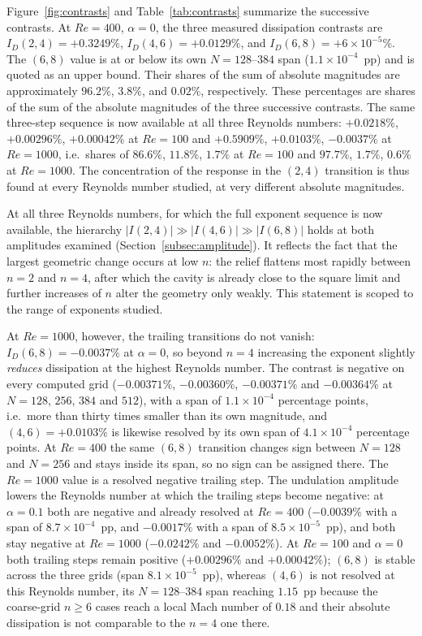 Figure~\ref{fig:contrasts} and Table~\ref{tab:contrasts} summarize the successive contrasts. At $Re=400$, $\alpha=0$, the three measured dissipation contrasts are $I_D(2,4)=+0.3249\%$, $I_D(4,6)=+0.0129\%$, and $I_D(6,8)=+6\times10^{-5}\%$. The $(6,8)$ value is at or below its own $N = 128$--$384$ span ($1.1\times10^{-4}$~pp) and is quoted as an upper bound. Their shares of the sum of absolute magnitudes are approximately $96.2\%$, $3.8\%$, and $0.02\%$, respectively. These percentages are shares of the sum of the absolute magnitudes of the three successive contrasts. The same three-step sequence is now available at all three Reynolds numbers: $+0.0218\%$, $+0.00296\%$, $+0.00042\%$ at $Re=100$ and $+0.5909\%$, $+0.0103\%$, $-0.0037\%$ at $Re=1000$, i.e.\ shares of $86.6\%$, $11.8\%$, $1.7\%$ at $Re=100$ and $97.7\%$, $1.7\%$, $0.6\%$ at $Re=1000$. The concentration of the response in the $(2,4)$ transition is thus found at every Reynolds number studied, at very different absolute magnitudes.

At all three Reynolds numbers, for which the full exponent sequence is now available, the hierarchy $|I(2,4)|\gg|I(4,6)|\gg|I(6,8)|$ holds at both amplitudes examined (Section~\ref{subsec:amplitude}). It reflects the fact that the largest geometric change occurs at low $n$: the relief flattens most rapidly between $n=2$ and $n=4$, after which the cavity is already close to the square limit and further increases of $n$ alter the geometry only weakly. This statement is scoped to the range of exponents studied.

At $Re=1000$, however, the trailing transitions do not vanish: $I_D(6,8)=-0.0037\%$ at $\alpha=0$, so beyond $n=4$ increasing the exponent slightly \emph{reduces} dissipation at the highest Reynolds number. The contrast is negative on every computed grid ($-0.00371\%$, $-0.00360\%$, $-0.00371\%$ and $-0.00364\%$ at $N=128$, $256$, $384$ and $512$), with a span of $1.1\times10^{-4}$ percentage points, i.e.\ more than thirty times smaller than its own magnitude, and $(4,6)=+0.0103\%$ is likewise resolved by its own span of $4.1\times10^{-4}$ percentage points. At $Re=400$ the same $(6,8)$ transition changes sign between $N=128$ and $N=256$ and stays inside its span, so no sign can be assigned there. The $Re=1000$ value is a resolved negative trailing step. The undulation amplitude lowers the Reynolds number at which the trailing steps become negative: at $\alpha=0.1$ both are negative and already resolved at $Re=400$ ($-0.0039\%$ with a span of $8.7\times10^{-4}$~pp, and $-0.0017\%$ with a span of $8.5\times10^{-5}$~pp), and both stay negative at $Re=1000$ ($-0.0242\%$ and $-0.0052\%$). At $Re=100$ and $\alpha=0$ both trailing steps remain positive ($+0.00296\%$ and $+0.00042\%$); $(6,8)$ is stable across the three grids (span $8.1\times10^{-5}$~pp), whereas $(4,6)$ is not resolved at this Reynolds number, its $N=128$--$384$ span reaching $1.15$~pp because the coarse-grid $n\ge6$ cases reach a local Mach number of $0.18$ and their absolute dissipation is not comparable to the $n=4$ one there.

